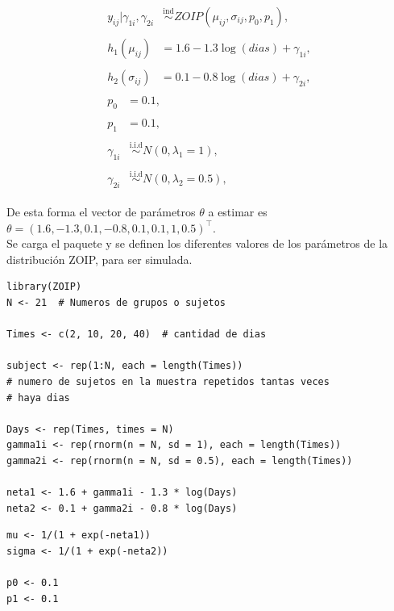 \begin{align*}
\begin{split}
y_{ij}| \gamma_{1i},\gamma_{2i} & \overset{\text{ind}}{\sim} ZOIP(\mu_{ij},\sigma_{ij},p_{0}, p_{1}),
\end{split}\\
\begin{split}
	h_1(\mu_{ij}) &= 1.6-1.3 \log(dias) + \gamma_{1i},
\end{split}\\
\begin{split}
	h_2(\sigma_{ij}) &= 0.1-0.8\log(dias) + \gamma_{2i},
\end{split}\\
\begin{split}
	p_{0} &= 0.1,
\end{split}\\
\begin{split}
	p_{1} &= 0.1,
\end{split}\\
\begin{split}
	\gamma_{1i} & \overset{\text{i.i.d}}{\sim}  N(0,\lambda_1=1),
\end{split}\\
\begin{split}
	\gamma_{2i} & \overset{\text{i.i.d}}{\sim}  N(0,\lambda_2=0.5),
\end{split}
\end{align*}

De esta forma el vector de par\'{a}metros $\theta$ a estimar es $\theta=(1.6, -1.3, 0.1, -0.8, 0.1, 0.1, 1, 0.5)^{\top}$.\\

Se carga el paquete  y se definen los diferentes valores de los par\'{a}metros de la distribuci\'{o}n ZOIP, para ser simulada.


\begin{verbatim}
library(ZOIP)
N <- 21  # Numeros de grupos o sujetos

Times <- c(2, 10, 20, 40)  # cantidad de dias

subject <- rep(1:N, each = length(Times))
# numero de sujetos en la muestra repetidos tantas veces
# haya dias

Days <- rep(Times, times = N)
gamma1i <- rep(rnorm(n = N, sd = 1), each = length(Times))
gamma2i <- rep(rnorm(n = N, sd = 0.5), each = length(Times))

neta1 <- 1.6 + gamma1i - 1.3 * log(Days)
neta2 <- 0.1 + gamma2i - 0.8 * log(Days)
\end{verbatim}
\begin{verbatim}
mu <- 1/(1 + exp(-neta1))
sigma <- 1/(1 + exp(-neta2))

p0 <- 0.1
p1 <- 0.1
\end{verbatim}

